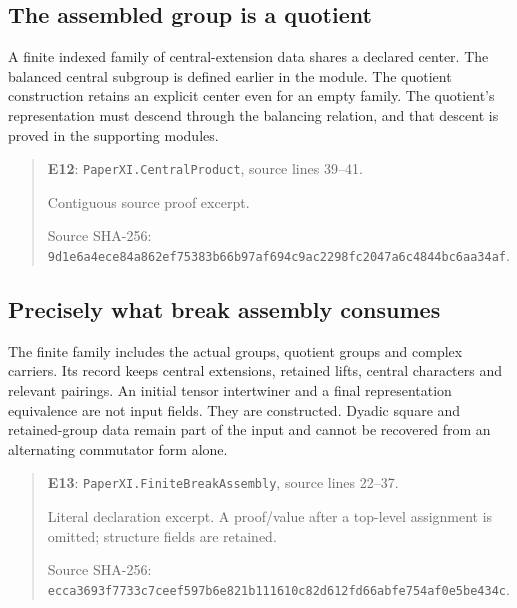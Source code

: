 \documentclass[10pt,oneside]{book}
\begin{document}

\subsection{The assembled group is a quotient}
\label{guide:E12}
A finite indexed family of central-extension data shares a declared center. The balanced central subgroup is defined earlier in the module.
The quotient construction retains an explicit center even for an empty family. The quotient's representation must descend through the balancing relation, and that descent is proved in the supporting modules.

\begin{quote}\footnotesize\textbf{E12}: \nolinkurl{PaperXI.CentralProduct}, source lines 39--41.\par Contiguous source proof excerpt.\par Source SHA-256: {\scriptsize\texttt{9d1e6a4ece84a862ef75383b66b97af694c9ac2298fc2047a6c4844bc6aa34af}}.\end{quote}


\subsection{Precisely what break assembly consumes}
\label{guide:E13}
The finite family includes the actual groups, quotient groups and complex carriers. Its record keeps central extensions, retained lifts, central characters and relevant pairings.
An initial tensor intertwiner and a final representation equivalence are not input fields. They are constructed. Dyadic square and retained-group data remain part of the input and cannot be recovered from an alternating commutator form alone.

\begin{quote}\footnotesize\textbf{E13}: \nolinkurl{PaperXI.FiniteBreakAssembly}, source lines 22--37.\par Literal declaration excerpt. A proof/value after a top-level assignment is omitted; structure fields are retained.\par Source SHA-256: {\scriptsize\texttt{ecca3693f7733c7ceef597b6e821b111610c82d612fd66abfe754af0e5be434c}}.\end{quote}
\end{document}
